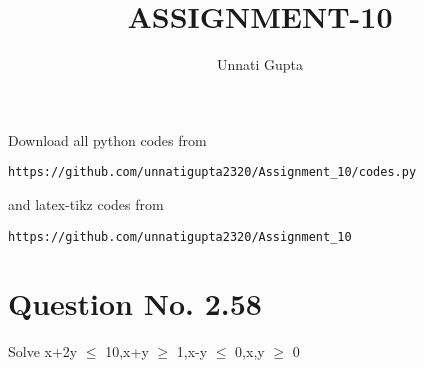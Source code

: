 \documentclass[journal,12pt,twocolumn]{IEEEtran}
\begin{document}
     \def\centbox#1{\makebox[0in]{#1}}
     \def\topbox#1{\raisebox{-\baselineskip}[0in][0in]{#1}}
     \def\midbox#1{\raisebox{-0.5\baselineskip}[0in][0in]{#1}}
\vspace{3cm}
\title{ASSIGNMENT-10}
\author{Unnati Gupta}
\maketitle
\newpage
\bigskip
\renewcommand{\thefigure}{\theenumi}
\renewcommand{\thetable}{\theenumi}
Download all python codes from 
\begin{lstlisting}
https://github.com/unnatigupta2320/Assignment_10/codes.py
\end{lstlisting}
%
and latex-tikz codes from 
%
\begin{lstlisting}
https://github.com/unnatigupta2320/Assignment_10
\end{lstlisting}
%
\section{Question No. 2.58}
Solve x+2y $\leq$ 10,x+y $\geq$ 1,x-y $\leq$ 0,x,y $\geq$ 0 
\end{document}
